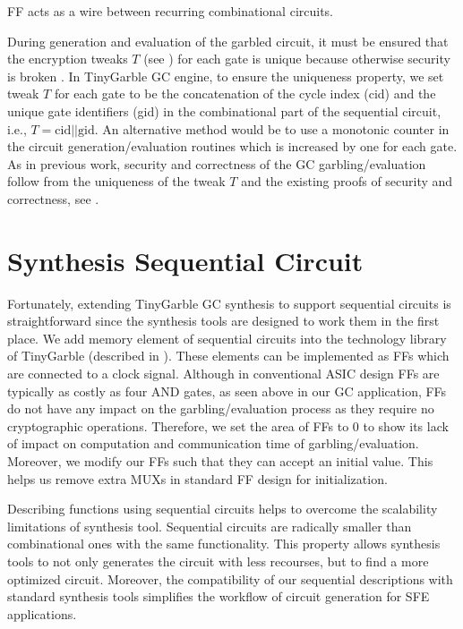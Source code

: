 FF acts as a wire between recurring combinational circuits.

During generation and evaluation of the garbled circuit, it must be ensured that the encryption tweaks $T$ (see ) for each gate is unique because otherwise security is broken \cite[Sect. 3.4]{henecka2013faster}.
In TinyGarble GC engine, to ensure the uniqueness property, we set tweak $T$ for each gate to be the concatenation of the cycle index (cid) and the unique gate identifiers (gid) in the combinational part of the sequential circuit, i.e., $T = \textrm{cid} || \textrm{gid}$.
An alternative method would be to use a monotonic counter in the circuit generation/evaluation routines which is increased by one for each gate.
As in previous work, security and correctness of the GC garbling/evaluation follow from the uniqueness of the tweak $T$ and the existing proofs of security and correctness, see \cite{lindell2009proof, bellare2013efficient}.

\section{Synthesis Sequential Circuit}
Fortunately, extending TinyGarble GC synthesis to support sequential circuits is straightforward since the synthesis tools are designed to work them in the first place.
We add memory element of sequential circuits into the technology library of TinyGarble (described in ).
These elements can be implemented as FFs which are connected to a clock signal.
Although in conventional ASIC design FFs are typically as costly as four AND gates, as seen above in our GC application, FFs do not have any impact on the garbling/evaluation process as they require no cryptographic operations.
Therefore, we set the area of FFs to 0 to show its lack of impact on computation and communication time of garbling/evaluation.
Moreover, we modify our FFs such that they can accept an initial value.
This helps us remove extra MUXs in standard FF design for initialization.

Describing functions using sequential circuits helps to overcome the scalability limitations of synthesis tool.
Sequential circuits are radically smaller than combinational ones with the same functionality.
This property allows synthesis tools to not only generates the circuit with less recourses, but to find a more optimized circuit.
Moreover, the compatibility of our sequential descriptions with standard synthesis tools simplifies the workflow of circuit generation for SFE applications.

